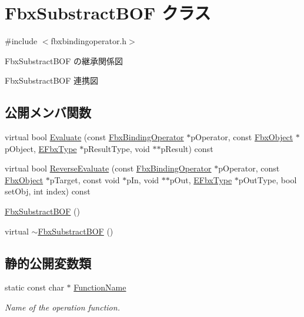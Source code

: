 \hypertarget{class_fbx_substract_b_o_f}{}\section{Fbx\+Substract\+B\+OF クラス}
\label{class_fbx_substract_b_o_f}


{\ttfamily \#include $<$fbxbindingoperator.\+h$>$}



Fbx\+Substract\+B\+OF の継承関係図


Fbx\+Substract\+B\+OF 連携図
\subsection*{公開メンバ関数}
\begin{DoxyCompactItemize}
\item 
virtual bool \hyperlink{class_fbx_substract_b_o_f_a2c01671e4d9c6664557536e2bd748a3b}{Evaluate} (const \hyperlink{class_fbx_binding_operator}{Fbx\+Binding\+Operator} $\ast$p\+Operator, const \hyperlink{class_fbx_object}{Fbx\+Object} $\ast$p\+Object, \hyperlink{fbxpropertytypes_8h_a73913a5ddfb20e57c6f25e9e6784bd92}{E\+Fbx\+Type} $\ast$p\+Result\+Type, void $\ast$$\ast$p\+Result) const
\item 
virtual bool \hyperlink{class_fbx_substract_b_o_f_a86004768a640d77ca9d7d937c4a91d2c}{Reverse\+Evaluate} (const \hyperlink{class_fbx_binding_operator}{Fbx\+Binding\+Operator} $\ast$p\+Operator, const \hyperlink{class_fbx_object}{Fbx\+Object} $\ast$p\+Target, const void $\ast$p\+In, void $\ast$$\ast$p\+Out, \hyperlink{fbxpropertytypes_8h_a73913a5ddfb20e57c6f25e9e6784bd92}{E\+Fbx\+Type} $\ast$p\+Out\+Type, bool set\+Obj, int index) const
\item 
\hyperlink{class_fbx_substract_b_o_f_a29ce4c8319a19a5058556679c86ce0c7}{Fbx\+Substract\+B\+OF} ()
\item 
virtual \hyperlink{class_fbx_substract_b_o_f_a13b785a1c93398609cfde76fbde7d0b4}{$\sim$\+Fbx\+Substract\+B\+OF} ()
\end{DoxyCompactItemize}
\subsection*{静的公開変数類}
\begin{DoxyCompactItemize}
\item 
static const char $\ast$ \hyperlink{class_fbx_substract_b_o_f_a9fc179455ff9204e58db8670b51c44b2}{Function\+Name}
\begin{DoxyCompactList}\small\item\em Name of the operation function. \end{DoxyCompactList}\end{DoxyCompactItemize}


